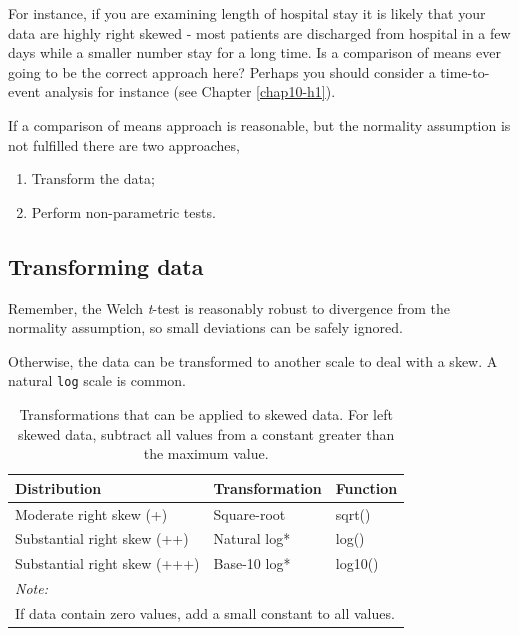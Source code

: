 \documentclass[
  12pt,
  krantz2]{krantz}
\providecommand{\tightlist}{%
  \setlength{\itemsep}{0pt}\setlength{\parskip}{0pt}}
\begin{document}
For instance, if you are examining length of hospital stay it is likely that your data are highly right skewed - most patients are discharged from hospital in a few days while a smaller number stay for a long time.
Is a comparison of means ever going to be the correct approach here?
Perhaps you should consider a time-to-event analysis for instance (see Chapter \ref{chap10-h1}).

If a comparison of means approach is reasonable, but the normality assumption is not fulfilled there are two approaches,

\begin{enumerate}
\def\labelenumi{\arabic{enumi}.}
\tightlist
\item
  Transform the data;
\item
  Perform non-parametric tests.
\end{enumerate}

\hypertarget{chap06-transform}{%
\subsection{Transforming data}\label{chap06-transform}}


Remember, the Welch \emph{t}-test is reasonably robust to divergence from the normality assumption, so small deviations can be safely ignored.

Otherwise, the data can be transformed to another scale to deal with a skew.
A natural \texttt{log} scale is common.

\begin{table}[!h]

\caption{\label{tab:unnamed-chunk-21}Transformations that can be applied to skewed data. For left skewed data, subtract all values from a constant greater than the maximum value.}
\centering
\begin{tabular}[t]{lll}
\toprule
Distribution & Transformation & Function\\
\midrule
Moderate right skew (+) & Square-root & sqrt()\\
Substantial right skew (++) & Natural log* & log()\\
Substantial right skew (+++) & Base-10 log* & log10()\\
\bottomrule
\multicolumn{3}{l}{\textit{Note: }}\\
\multicolumn{3}{l}{If data contain zero values, add a small constant to all values.}\\
\end{tabular}
\end{table}
\end{document}
